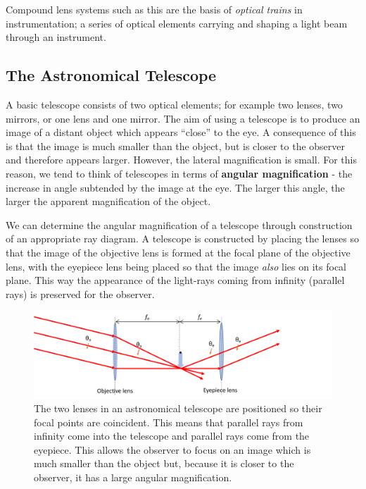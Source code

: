 \documentclass[
]{book}
\begin{document}
Compound lens systems such as this are the basis of \emph{optical trains} in instrumentation; a series of optical elements carrying and shaping a light beam through an instrument.

\hypertarget{sec:ch16-astronomicaltelescope}{%
\subsection{The Astronomical Telescope}\label{sec:ch16-astronomicaltelescope}}

A basic telescope consists of two optical elements; for example two lenses, two mirrors, or one lens and one mirror. The aim of using a telescope is to produce an image of a distant object which appears ``close'' to the eye. A consequence of this is that the image is much smaller than the object, but is closer to the observer and therefore appears larger. However, the lateral magnification is small. For this reason, we tend to think of telescopes in terms of \textbf{angular magnification} - the increase in angle subtended by the image at the eye. The larger this angle, the larger the apparent magnification of the object.

We can determine the angular magnification of a telescope through construction of an appropriate ray diagram. A telescope is constructed by placing the lenses so that the image of the objective lens is formed at the focal plane of the objective lens, with the eyepiece lens being placed so that the image \emph{also} lies on its focal plane. This way the appearance of the light-rays coming from infinity (parallel rays) is preserved for the observer.

\begin{figure}

{\centering \includegraphics[width=0.7\linewidth]{visualisations/LaTeX/ch16-telescopeset1a} 

}

\caption{The two lenses in an astronomical telescope are positioned so their focal points are coincident. This means that parallel rays from infinity come into the telescope and parallel rays come from the eyepiece. This allows the observer to focus on an image which is much smaller than the object but, because it is closer to the observer, it has a large angular magnification.}\label{fig:ch16-telescopeoptics1}
\end{figure}
\end{document}
